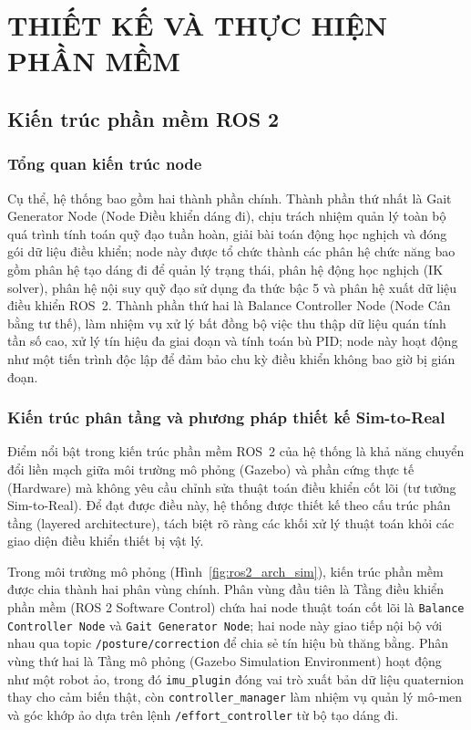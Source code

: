 \chapter{THIẾT KẾ VÀ THỰC HIỆN PHẦN MỀM}

\section{Kiến trúc phần mềm ROS 2}

\subsection{Tổng quan kiến trúc node}

Cụ thể, hệ thống bao gồm hai thành phần chính. Thành phần thứ nhất là Gait Generator Node (Node Điều khiển dáng đi), chịu trách nhiệm quản lý toàn bộ quá trình tính toán quỹ đạo tuần hoàn, giải bài toán động học nghịch và đóng gói dữ liệu điều khiển; node này được tổ chức thành các phân hệ chức năng bao gồm phân hệ tạo dáng đi để quản lý trạng thái, phân hệ động học nghịch (IK solver), phân hệ nội suy quỹ đạo sử dụng đa thức bậc 5 và phân hệ xuất dữ liệu điều khiển ROS~2. Thành phần thứ hai là Balance Controller Node (Node Cân bằng tư thế), làm nhiệm vụ xử lý bất đồng bộ việc thu thập dữ liệu quán tính tần số cao, xử lý tín hiệu đa giai đoạn và tính toán bù PID; node này hoạt động như một tiến trình độc lập để đảm bảo chu kỳ điều khiển không bao giờ bị gián đoạn.

\subsection{Kiến trúc phân tầng và phương pháp thiết kế Sim-to-Real}

Điểm nổi bật trong kiến trúc phần mềm ROS~2 của hệ thống là khả năng chuyển đổi liền mạch giữa môi trường mô phỏng (Gazebo) và phần cứng thực tế (Hardware) mà không yêu cầu chỉnh sửa thuật toán điều khiển cốt lõi (tư tưởng Sim-to-Real). Để đạt được điều này, hệ thống được thiết kế theo cấu trúc phân tầng (layered architecture), tách biệt rõ ràng các khối xử lý thuật toán khỏi các giao diện điều khiển thiết bị vật lý.

Trong môi trường mô phỏng (Hình~\ref{fig:ros2_arch_sim}), kiến trúc phần mềm được chia thành hai phân vùng chính. Phân vùng đầu tiên là Tầng điều khiển phần mềm (ROS 2 Software Control) chứa hai node thuật toán cốt lõi là \texttt{Balance Controller Node} và \texttt{Gait Generator Node}; hai node này giao tiếp nội bộ với nhau qua topic \texttt{/posture/correction} để chia sẻ tín hiệu bù thăng bằng. Phân vùng thứ hai là Tầng mô phỏng (Gazebo Simulation Environment) hoạt động như một robot ảo, trong đó \texttt{imu\_plugin} đóng vai trò xuất bản dữ liệu quaternion thay cho cảm biến thật, còn \texttt{controller\_manager} làm nhiệm vụ quản lý mô-men và góc khớp ảo dựa trên lệnh \texttt{/effort\_controller} từ bộ tạo dáng đi.

